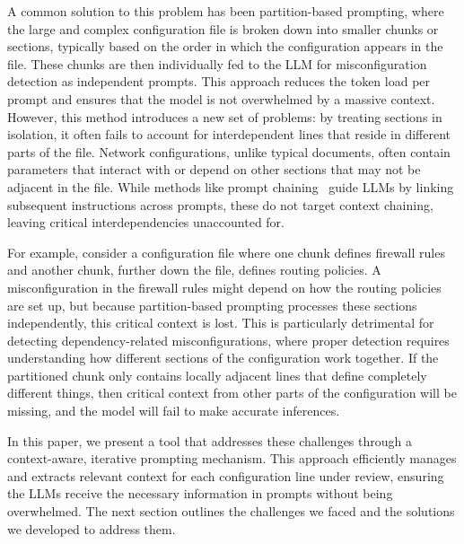 A common solution to this problem has been partition-based prompting, where the large and complex configuration file is broken down into smaller chunks or sections, typically based on the order in which the configuration appears in the file. These chunks are then individually fed to the LLM for misconfiguration detection as independent prompts. This approach reduces the token load per prompt and ensures that the model is not overwhelmed by a massive context. However, this method introduces a new set of problems: by treating sections in isolation, it often fails to account for interdependent lines that reside in different parts of the file. Network configurations, unlike typical documents, often contain parameters that interact with or depend on other sections that may not be adjacent in the file. While methods like prompt chaining~\cite{wang2024identifying,bogdanov2024leveraging} guide LLMs by linking subsequent instructions across prompts, these do not target context chaining, leaving critical interdependencies unaccounted for.

For example, consider a configuration file where one chunk defines firewall rules and another chunk, further down the file, defines routing policies. A misconfiguration in the firewall rules might depend on how the routing policies are set up, but because partition-based prompting processes these sections independently, this critical context is lost. This is particularly detrimental for detecting dependency-related misconfigurations, where proper detection requires understanding how different sections of the configuration work together. If the partitioned chunk only contains locally adjacent lines that define completely different things, then critical context from other parts of the configuration will be missing, and the model will fail to make accurate inferences.


In this paper, we present a tool that addresses these challenges through a context-aware, iterative prompting mechanism. This approach efficiently manages and extracts relevant context for each configuration line under review, ensuring the LLMs receive the necessary information in prompts without being overwhelmed. The next section outlines the challenges we faced and the solutions we developed to address them.